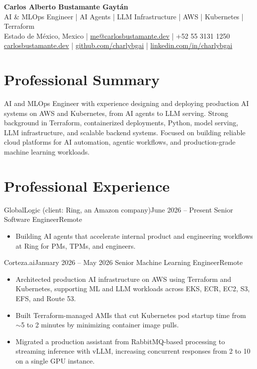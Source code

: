 \documentclass[10pt,letterpaper]{article}
\begin{document}
\begin{center}
    {\LARGE \textbf{Carlos Alberto Bustamante Gaytán}} \\[-1pt]
    AI \& MLOps Engineer | AI Agents | LLM Infrastructure | AWS | Kubernetes | Terraform \\[2pt]
    Estado de México, Mexico |
    \href{mailto:me@carlosbustamante.dev}{me@carlosbustamante.dev} |
    +52 55 3131 1250 \\
    \href{https://carlosbustamante.dev}{carlosbustamante.dev} |
    \href{https://github.com/charlybgai}{github.com/charlybgai} |
    \href{https://linkedin.com/in/charlybgai}{linkedin.com/in/charlybgai}
\end{center}

\section*{Professional Summary}
AI and MLOps Engineer with experience designing and deploying production AI systems on AWS and Kubernetes, from AI agents to LLM serving. Strong background in Terraform, containerized deployments, Python, model serving, LLM infrastructure, and scalable backend systems. Focused on building reliable cloud platforms for AI automation, agentic workflows, and production-grade machine learning workloads.

\section*{Professional Experience}

\entry
{GlobalLogic (client: Ring, an Amazon company)}{June 2026 -- Present}
{Senior Software Engineer}{Remote}
\begin{itemize}
  \item Building AI agents that accelerate internal product and engineering workflows at Ring for PMs, TPMs, and engineers.
\end{itemize}

\entry
{Corteza.ai}{January 2026 -- May 2026}
{Senior Machine Learning Engineer}{Remote}
\begin{itemize}
  \item Architected production AI infrastructure on AWS using Terraform and Kubernetes, supporting ML and LLM workloads across EKS, ECR, EC2, S3, EFS, and Route 53.
  \item Built Terraform-managed AMIs that cut Kubernetes pod startup time from $\sim$5 to 2 minutes by minimizing container image pulls.
  \item Migrated a production assistant from RabbitMQ-based processing to streaming inference with vLLM, increasing concurrent responses from 2 to 10 on a single GPU instance.
\end{itemize}
\end{document}
